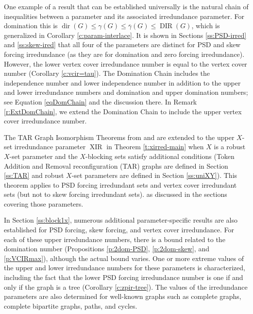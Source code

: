 \documentclass{article}
\numberwithin{figure}{section}
\numberwithin{table}{section}
\numberwithin{equation}{section}
\theoremstyle{definition}
\theoremstyle{definition}
\theoremstyle{definition}
\newcommand{\ol}{\overline}
\newcommand{\dbar}{\ol\gamma}
\DeclareMathOperator{\dir}{dir}
\DeclareMathOperator{\DIR}{DIR}
\DeclareMathOperator{\XIR}{XIR}
\begin{document}
  One example of a result that can be established universally  is the natural chain of inequalities between a parameter and its associated irredundance parameter. For domination this is $\dir(G)\le \gamma(G)\le \dbar(G)\le \DIR(G)$, which is generalized in Corollary \ref{c:param-interlace}.  
 It is shown in Sections \ref{ss:PSD-irred} and \ref{ss:skew-ired} that all four of the parameters are distinct for PSD and skew forcing irredundance (as they are for domination and zero forcing irredundance).  However, the lower vertex cover irredundance number is equal to the vertex cover number (Corollary \ref{c:vcir=tau}).   The Domination Chain \cite{CHM78, MR21} includes the independence number and lower independence number in addition to the upper and lower irredundance numbers and domination and upper domination numbers; see   Equation \eqref{eqDomChain} and the discussion there.
 In Remark \ref{r:ExtDomChain}, we extend the Domination Chain to include the upper vertex cover irredundance number.

  The  TAR Graph Isomorphism Theorems from \cite{XTARiso} and \cite{XTAR-YTAR} are extended to the upper $X$-set irredundance parameter $\XIR$ in Theorem \ref{t:xirred-main} when $X$ is a robust $X$-set parameter  and the $X$-blocking sets satisfy additional conditions (Token Addition and Removal reconfiguration (TAR) graphs are defined in Section \ref{ss:TAR} and robust $X$-set parameters are defined in Section \ref{ss:uniXY}).  This theorem applies to  PSD forcing irredundant sets and vertex cover irredundant sets (but not to skew forcing irredundant sets). 
  as discussed in the sections covering those parameters.
  
 In Section \ref{ss:block1x}, numerous additional parameter-specific results are also established  for PSD forcing, skew forcing, and vertex cover irredundance.   For each of these  upper irredundance numbers, there is a bound related to the domination number (Propositions \ref{p:2dom-PSD}, \ref{p:2dom-skew}, and \ref{p:VCIRmax}), although the actual bound varies.  One or more extreme values of the  upper and lower irredundance numbers  for %
 these parameters is characterized,  including the fact that the  lower PSD forcing irredundance number is one if and only if the graph is a tree (Corollary \ref{c:zpir-tree}).  The values of the irredundance parameters are also determined for well-known graphs such as complete graphs, complete bipartite graphs, paths, and cycles.
 
\end{document}
